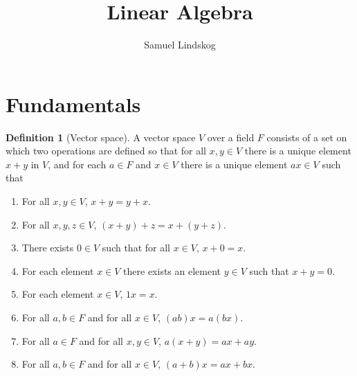 \documentclass{article}
\begin{document}
\theoremstyle{definition}\newtheorem{defi}{Definition}[section]
\theoremstyle{definition}\newtheorem{axiom}{Axiom}[section]
\theoremstyle{definition}\newtheorem{thm}{Theorem}[section]
\theoremstyle{definition}\newtheorem{cor}{Corollary}[section]
\theoremstyle{definition}\newtheorem{lem}{Lemma}[section]
\theoremstyle{remark}\newtheorem*{notat}{Notation}
\theoremstyle{remark}\newtheorem*{rema}{Remark}
\theoremstyle{definition}\newtheorem{problem}{Problem}
\newenvironment{prob}[1]{\protect\setcounter{problem}{#1}\addtocounter{problem}{-1}\begin{problem}}{\end{problem}}

\DeclarePairedDelimiter{\ceil}{\lceil}{\rceil}
\DeclarePairedDelimiter{\floor}{\lfloor}{\rfloor}

\title{Linear Algebra}
\author{Samuel Lindskog}
\maketitle
\section{Fundamentals}
\begin{defi}[Vector space]
	A vector space \(V\) over a field \(F\) consists of a set on which two operations are defined so that for all \(x,y\in V\) there is a unique element \(x+y\) in \(V\), and for each \(a\in F\) and \(x\in V\) there is a unique element \(ax\in V\) such that
	\begin{enumerate}
		\item For all \(x,y\in V\), \(x+y=y+x\).
		\item For all \(x,y,z\in V\), \((x+y)+z=x+(y+z)\).
		\item There exists \(0\in V\) such that for all \(x\in V\), \(x+0=x\).
		\item For each element \(x\in V\) there exists an element \(y\in V\) such that \(x+y=0\).
		\item For each element \(x\in V\), \(1x=x\).
		\item For all \(a,b\in F\) and for all \(x\in V\), \((ab)x=a(bx)\).
		\item For all \(a\in F\) and for all \(x,y\in V\), \(a(x+y)=ax+ay\).
		\item For all \(a,b\in F\) and for all \(x\in V\), \((a+b)x=ax+bx\).
	\end{enumerate}
\end{defi}
\end{document}
